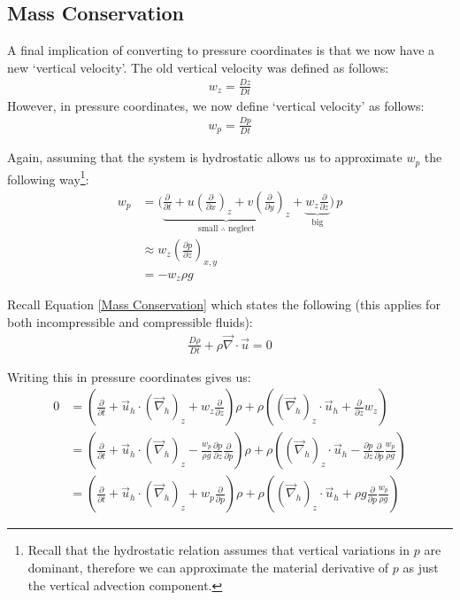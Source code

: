 \subsection{Mass Conservation}

A final implication of converting to pressure coordinates is that we now have a new `vertical velocity'. The old vertical velocity was defined as follows:
\begin{align*}
    w_z = \frac{D z}{Dt}
\end{align*}
However, in pressure coordinates, we now define `vertical velocity' as follows:
\begin{align*}
    w_p = \frac{D p}{Dt}
\end{align*}

Again, assuming that the system is hydrostatic allows us to approximate $w_p$ the following way\footnote{
    Recall that the hydrostatic relation assumes that vertical variations in $p$ are dominant, therefore we can approximate the material derivative of $p$ as just the vertical advection component.
}:
\begin{align*}
    w_p &= \biggl( \underbrace{\frac{\partial }{\partial t} + u\left( \frac{\partial}{\partial x} \right)_{z}+v\left( \frac{\partial}{\partial y} \right)_{z}}_{\text{small }\therefore \text{ neglect}}+\underbrace{w_z \frac{\partial}{\partial z}}_{\text{big}} \biggr)\, p
    \\
    &\approx w_z \left( \frac{\partial p}{\partial z} \right)_{x,y}
    \\
    & = -w_z\rho g
\end{align*}

Recall Equation \ref{Mass Conservation} which states the following (this applies for both incompressible and compressible fluids):
\begin{align*}
    \frac{D\rho}{Dt}+\rho\vec{\nabla}\cdot\vec{u}=0
\end{align*}

Writing this in pressure coordinates gives us:
\begin{align*}
    0&=\left( 
        \frac{\partial}{\partial t} 
        + \vec{u}_h \cdot \left( \vec{\nabla}_h \right)_z
        + w_z \frac{\partial}{\partial z}
    \right)\rho
    + \rho \left( 
        \left( \vec{\nabla}_h  \right)_z \cdot \vec{u}_h
        + \frac{\partial}{\partial z}w_z
    \right)
    \\
    &=\left( 
        \frac{\partial}{\partial t} 
        + \vec{u}_h \cdot \left( \vec{\nabla}_h \right)_z
        - \frac{w_p}{\rho g} \frac{\partial p}{\partial z}\frac{\partial}{\partial p}
    \right)\rho
    + \rho \left( 
        \left( \vec{\nabla}_h  \right)_z \cdot \vec{u}_h
        - \frac{\partial p}{\partial z} \frac{\partial}{\partial p} \frac{w_p}{\rho g}
    \right)
    \\
    &=\left( 
        \frac{\partial}{\partial t} 
        + \vec{u}_h \cdot \left( \vec{\nabla}_h \right)_z
        + w_p \frac{\partial}{\partial p}
    \right)\rho
    + \rho \left( 
        \left( \vec{\nabla}_h  \right)_z \cdot \vec{u}_h
        +\rho g \frac{\partial}{\partial p} \frac{w_p}{\rho g}
    \right)
\end{align*}


